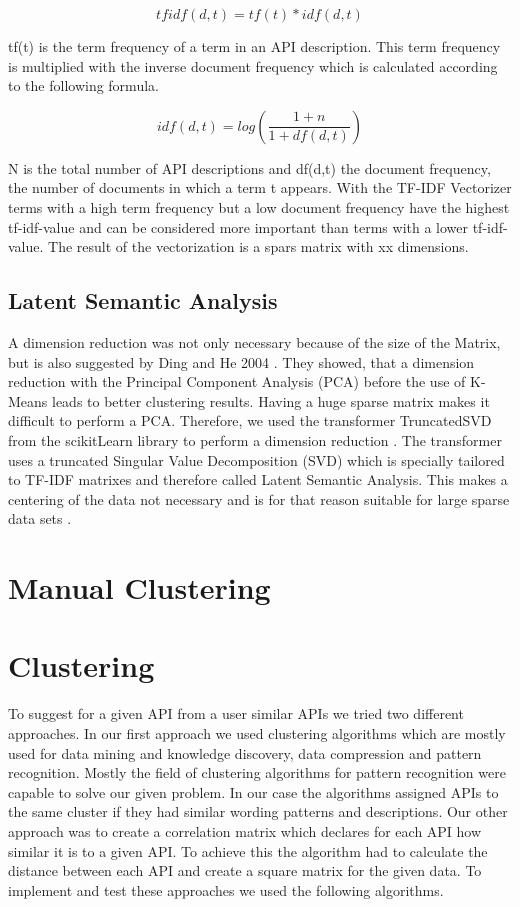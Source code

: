 \documentclass[a4paper]{IEEEtran}
\begin{document}
\begin{equation*}
tfidf (d,t) = tf(t) * idf(d,t) 
\end{equation*}

tf(t) is the term frequency of a term in an API description. This term frequency is multiplied with the inverse document frequency which is calculated according to the following formula.

\begin{equation*}
idf (d,t) = log\left( \frac{1+n}{1+df(d,t)} \right)
\end{equation*}

N is the total number of API descriptions and df(d,t) the document frequency, the number of documents in which a term t appears. 
With the TF-IDF Vectorizer terms with a high term frequency but a low document frequency have the highest tf-idf-value and can be considered more important than terms with a lower tf-idf-value. The result of the vectorization is a spars matrix with xx dimensions.

\subsection{Latent Semantic Analysis}
A dimension reduction was not only necessary because of the size of the Matrix, but is also suggested by Ding and He 2004 \cite{ding2004k}. They showed, that a dimension reduction with the Principal Component Analysis (PCA) before the use of K-Means leads to better clustering  results. Having a huge sparse matrix makes it difficult to perform a PCA. Therefore, we used the transformer TruncatedSVD from the scikitLearn library to perform a dimension reduction \cite{scikit-learn}. The transformer uses a truncated Singular Value Decomposition (SVD) which is specially tailored to TF-IDF matrixes and therefore called Latent Semantic Analysis. This makes a centering of the data not necessary and is for that reason suitable for large sparse data sets \cite{albright2004taming}.

\section{Manual Clustering}

\section{Clustering}
To suggest for a given API from a user similar APIs we tried two different approaches. In our first approach we used clustering algorithms which are mostly used for data mining and knowledge discovery, data compression and pattern recognition. Mostly the field of clustering algorithms for pattern recognition were capable to solve our given problem. In our case the algorithms assigned APIs to the same cluster if they had similar wording patterns and descriptions. 
Our other approach was to create a correlation matrix which declares for each API how similar it is to a given API. To achieve this the algorithm had to calculate the distance between each API and create a square matrix for the given data.
To implement and test these approaches we used the following algorithms.
\end{document}
